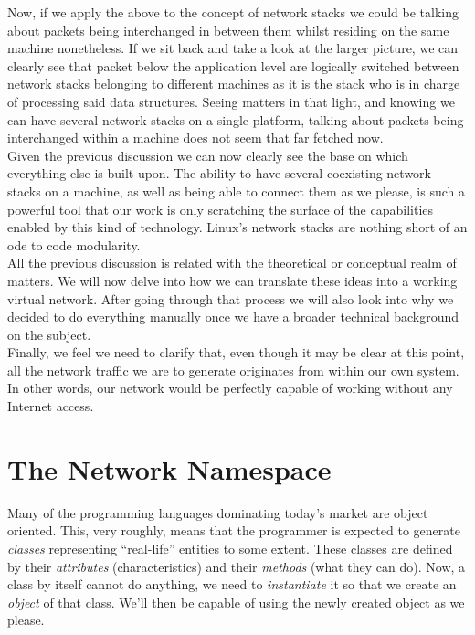         Now, if we apply the above to the concept of network stacks we could be talking about packets being interchanged in between them whilst residing on the same machine nonetheless. If we sit back and take a look at the larger picture, we can clearly see that packet below the application level are logically switched between network stacks belonging to different machines as it is the stack who is in charge of processing said data structures. Seeing matters in that light, and knowing we can have several network stacks on a single platform, talking about packets being interchanged within a machine does not seem that far fetched now.\\

        Given the previous discussion we can now clearly see the base on which everything else is built upon. The ability to have several coexisting network stacks on a machine, as well as being able to connect them as we please, is such a powerful tool that our work is only scratching the surface of the capabilities enabled by this kind of technology. Linux's network stacks are nothing short of an ode to code modularity.\\

        All the previous discussion is related with the theoretical or conceptual realm of matters. We will now delve into how we can translate these ideas into a working virtual network. After going through that process we will also look into why we decided to do everything manually once we have a broader technical background on the subject.\\

        Finally, we feel we need to clarify that, even though it may be clear at this point, all the network traffic we are to generate originates from within our own system. In other words, our network would be perfectly capable of working without any Internet access.\\

    \section{The Network Namespace}
        Many of the programming languages dominating today's market are object oriented. This, very roughly, means that the programmer is expected to generate \textit{classes} representing ``real-life'' entities to some extent. These classes are defined by their \textit{attributes} (characteristics) and their \textit{methods} (what they can do). Now, a class by itself cannot do anything, we need to \textit{instantiate} it so that we create an \textit{object} of that class. We'll then be capable of using the newly created object as we please.\\

